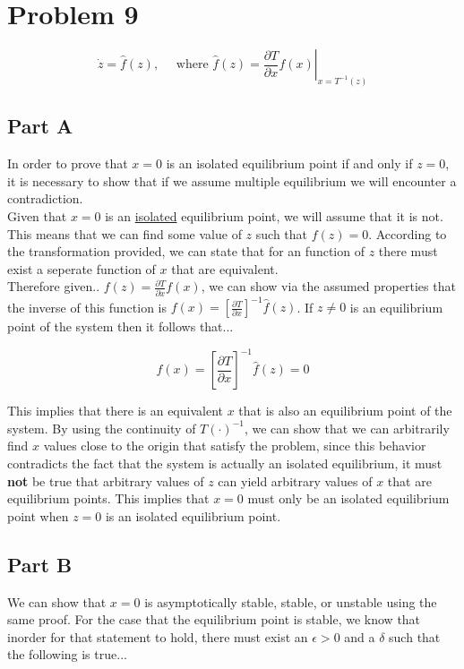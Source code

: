 \section*{Problem 9}

$$
\dot{z}=\hat{f}(z), \quad \text { where } \hat{f}(z)=\left.\frac{\partial T}{\partial x} f(x)\right|_{x=T^{-1}(z)}
$$


\subsection*{Part A}

In order to prove that $x = 0$ is an isolated equilibrium point if and only if $z = 0$, it is necessary to show that if we assume multiple equilibrium we will encounter a contradiction. \\

\noindent Given that $ x= 0$ is an \underline{isolated} equilibrium point, we will assume that it is not. This means that we can find some value of $z$ such that $f(z) = 0$. According to the transformation provided, we can state that for an function of $z$ there must exist a seperate function of $x$ that are equivalent. \\

\noindent Therefore given.. $f(z)=\frac{\partial T}{\partial x} f(x)$, we can show via the assumed properties that the inverse of this function is $f(x)= [\frac{\partial T}{\partial x} ]^{-1} \hat{f}(z) $. If $z \neq 0$ is an equilibrium point of the system then it follows that...

$$
f(x)= [\frac{\partial T}{\partial x} ]^{-1} \hat{f}(z) = 0
$$

\noindent This implies that there is an equivalent $x$ that is also an equilibrium point of the system. By using the continuity of $T(\cdot)^{-1}$, we can show that we can arbitrarily find $x$ values close to the origin that satisfy the problem, since this behavior contradicts the fact that the system is actually an isolated equilibrium, it must \textbf{not} be true that arbitrary values of $z$ can yield arbitrary values of $x$ that are equilibrium points. This implies that $x =0$ must only be an isolated equilibrium point when $z =0$ is an isolated equilibrium point.

\subsection*{Part B}

We can show that $x = 0$ is asymptotically stable, stable, or unstable using the same proof. For the case that the equilibrium point is stable, we know that inorder for that statement to hold, there must exist an $\epsilon >0$ and a $\delta$ such that the following is true...

